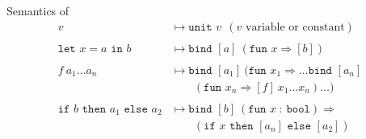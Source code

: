 \documentclass{beamer}
\begin{document}
\begin{frame}{Semantics of \rml}
  \begin{align*}
    v
    &\mapsto \texttt{unit }v ~~ (v \text{ variable or constant})\\ \\
    \texttt{let }x=a\texttt{ in } b
    &\mapsto \texttt{bind }[a]~(\texttt{fun } x \Rightarrow [b])\\ \\
    f~a_1\dots a_n
    &\mapsto \texttt{bind }[a_1]~(\texttt{fun } x_1 \Rightarrow \dots \texttt{bind }[a_n]
    \\ 
    &\hspace{2em} (\texttt{fun } x_n \Rightarrow [f]~x_1 \dots x_n) \dots ) \\\\
    \texttt{if $b$ then $a_1$ else $a_2$}
    &\mapsto  \texttt{bind } [b]~(\texttt{fun } x~:~\texttt{bool}) \Rightarrow\\
    &\hspace{2em} (\texttt{if $x$ then $[a_n]$ else $[a_2]$})
  \end{align*}
\end{frame}

\end{document}
